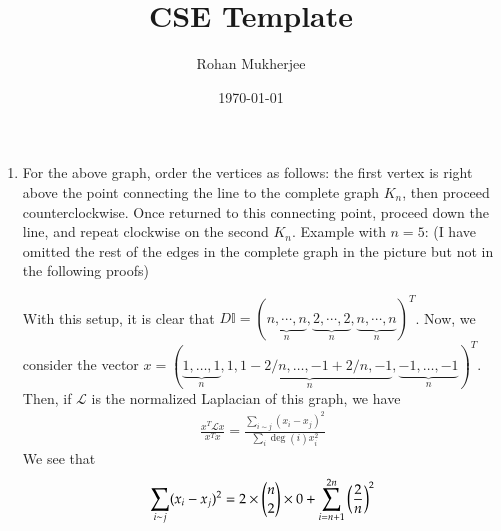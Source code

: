 \documentclass[12pt]{article}
\title{CSE Template}
\date{\today}
\author{Rohan Mukherjee}
\theoremstyle{definitionstyle}
\def\mbb#1{\mathbb{#1}}
\begin{document}
	\maketitle
	\begin{enumerate}[leftmargin=\labelsep]
		\item For the above graph, order the vertices as follows: the first vertex is right above the point connecting the line to the complete graph $K_n$, then proceed counterclockwise. Once returned to this connecting point, proceed down the line, and repeat clockwise on the second $K_n$. Example with $n=5$: (I have omitted the rest of the edges in the complete graph in the picture but not in the following proofs)
		
		With this setup, it is clear that $D \mbb I = (\underbrace{n, \cdots, n}_{n}, \underbrace{2, \cdots, 2}_{n}, \underbrace{n, \cdots, n}_{n})^T$. Now, we consider the vector $x = (\underbrace{1, \ldots, 1}_{n}, \underbrace{1, 1-2/n, \ldots, -1+2/n, -1}_n, \underbrace{-1, \ldots, -1}_{n})^T$. Then, if $\mathscr L$ is the normalized Laplacian of this graph, we have 
		\begin{align*}
			\frac{x^T\mathscr L x}{x^Tx} = \frac{\sum_{i \sim j} (x_i-x_j)^2}{\sum_i \deg(i)x_i^2}
		\end{align*}
		We see that 
		\begin{align*}
			\sum_{i \sim j} (x_i-x_j)^2 = 2 \times {n \choose 2}  \times 0 + \sum_{i=n+1}^{2n} \qty(\frac 2n)^2

\end{align*}
\end{enumerate}
\end{document}
